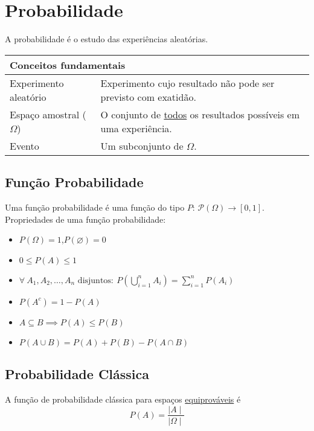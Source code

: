\documentclass{article}
\begin{document}
\section{Probabilidade}
A probabilidade é o estudo das experiências aleatórias.
\vspace{-5pt}
\begin{table}[h]
  \begin{tabular}{ll}
    \multicolumn{2}{l}{\hspace{-6pt}\textbf{Conceitos fundamentais}} \\ \midrule
     Experimento aleatório & Experimento cujo resultado não pode ser previsto com exatidão. \\[1pt]
     Espaço amostral ($\Omega$) & O conjunto de \uline{todos} os resultados possíveis em uma experiência. \\[1pt]
     Evento & Um subconjunto de $\Omega$. \\[1pt]
  \end{tabular}
\end{table} \vspace{-10pt}


\subsection{Função Probabilidade}
Uma função probabilidade é uma função do tipo $P:\, \mathcal{P}(\Omega) \to [0, 1]$. \\[5pt]
Propriedades de uma função probabilidade:
\begin{itemize}
  \item $P(\Omega) = 1$,\enspace $P(\varnothing) = 0$
  \item $0 \leq P(A) \leq 1$
  \item $\forall \: A_1, A_2, \hdots, A_n \text{ disjuntos}:\: P\left(\bigcup\limits_{i=1}^{n} A_i\right) = \sum\limits_{i=1}^{n} P(A_i)$
  \item $P(A^c) = 1 - P(A)$
  \item $A \subseteq B \implies P(A) \leq P(B)$
  \item $P(A \cup B) = P(A) + P(B) - P(A \cap B)$
\end{itemize}


\subsection{Probabilidade Clássica}
A função de probabilidade clássica para espaços \uline{equiprováveis} é
\[ P(A) = \frac{\mid A \mid}{\mid \Omega \mid} \]
\end{document}
